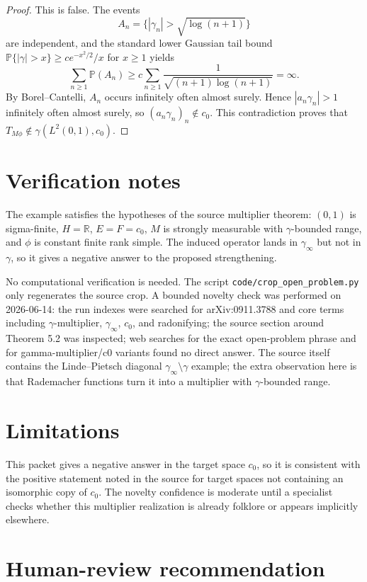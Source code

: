 \documentclass[11pt]{article}
\newcommand{\R}{\mathbb R}
\newcommand{\Prob}{\mathbb P}
\begin{document}
\begin{proof}
This is false.  The events
\[
  A_n=\{|\gamma_n|>\sqrt{\log(n+1)}\}
\]
are independent, and the standard lower Gaussian tail bound
\(\Prob\{|\gamma|>x\}\ge c e^{-x^2/2}/x\) for \(x\ge1\) yields
\[
  \sum_{n\ge1}\Prob(A_n)
  \ge
  c\sum_{n\ge1}\frac{1}{\sqrt{(n+1)\log(n+1)}}=\infty .
\]
By Borel--Cantelli, \(A_n\) occurs infinitely often almost surely.  Hence
\(|a_n\gamma_n|>1\) infinitely often almost surely, so
\((a_n\gamma_n)_n\notin c_0\).  This contradiction proves that
\(T_{M\phi}\notin\gamma(L^2(0,1),c_0)\).
\end{proof}

\section*{Verification notes}

The example satisfies the hypotheses of the source multiplier theorem:
\((0,1)\) is sigma-finite, \(H=\R\), \(E=F=c_0\), \(M\) is strongly
measurable with \(\gamma\)-bounded range, and \(\phi\) is constant finite
rank simple.  The induced operator lands in \(\gamma_\infty\) but not in
\(\gamma\), so it gives a negative answer to the proposed strengthening.

No computational verification is needed.  The script
\texttt{code/crop\_open\_problem.py} only regenerates the source crop.  A
bounded novelty check was performed on 2026-06-14: the run indexes were
searched for arXiv:0911.3788 and core terms including
\(\gamma\)-multiplier, \(\gamma_\infty\), \(c_0\), and radonifying; the
source section around Theorem 5.2 was inspected; web searches for the exact
open-problem phrase and for gamma-multiplier/c0 variants found no direct
answer.  The source itself contains the Linde--Pietsch diagonal
\(\gamma_\infty\setminus\gamma\) example; the extra observation here is that
Rademacher functions turn it into a multiplier with \(\gamma\)-bounded range.

\section*{Limitations}

This packet gives a negative answer in the target space \(c_0\), so it is
consistent with the positive statement noted in the source for target spaces
not containing an isomorphic copy of \(c_0\).  The novelty confidence is
moderate until a specialist checks whether this multiplier realization is
already folklore or appears implicitly elsewhere.

\section*{Human-review recommendation}
\end{document}

